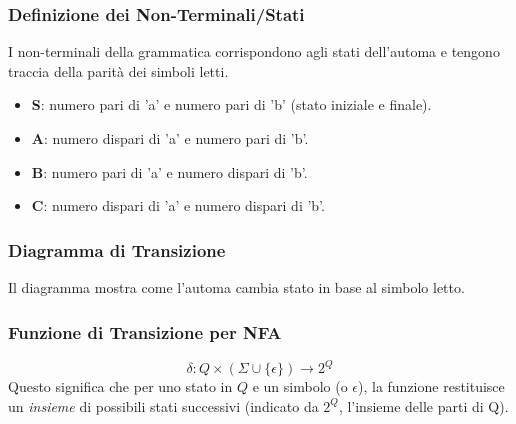 \subsubsection{Definizione dei Non-Terminali/Stati}
I non-terminali della grammatica corrispondono agli stati dell'automa e tengono traccia della parità dei simboli letti.
\begin{itemize}
    \item \textbf{S}: numero pari di 'a' e numero pari di 'b' (stato iniziale e finale).
    \item \textbf{A}: numero dispari di 'a' e numero pari di 'b'.
    \item \textbf{B}: numero pari di 'a' e numero dispari di 'b'.
    \item \textbf{C}: numero dispari di 'a' e numero dispari di 'b'.
\end{itemize}

\subsubsection{Diagramma di Transizione}
Il diagramma mostra come l'automa cambia stato in base al simbolo letto.

\begin{center}
\end{center}

\subsubsection{Funzione di Transizione per NFA}
\[ \delta: Q \times (\Sigma \cup \{\epsilon\}) \rightarrow 2^Q \]
Questo significa che per uno stato in $Q$ e un simbolo (o $\epsilon$), la funzione restituisce un \textit{insieme} di possibili stati successivi (indicato da $2^Q$, l'insieme delle parti di Q). 
